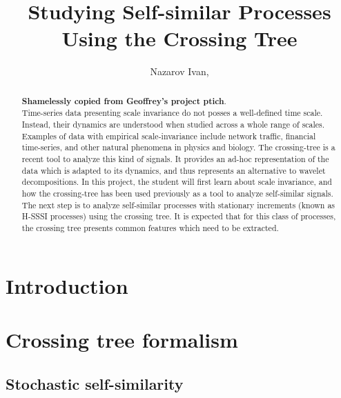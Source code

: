 \documentclass[a4paper]{report}
\title{Studying Self-similar Processes Using the Crossing Tree}
\author{Nazarov Ivan, \rus{101мНОД(ИССА)}}
\begin{document}

\clearpage


\clearpage

\maketitle
\begin{abstract}
\textbf{Shamelessly copied from Geoffrey's project ptich}.\hfill \\
Time-series data presenting scale invariance do not posses a well-defined time scale.
Instead, their dynamics are understood when studied across a whole range of scales.
Examples of data with empirical scale-invariance include network traffic, financial
time-series, and other natural phenomena in physics and biology. The crossing-tree
is a recent tool to analyze this kind of signals. It provides an ad-hoc representation
of the data which is adapted to its dynamics, and thus represents an alternative to
wavelet decompositions. In this project, the student will first learn about scale
invariance, and how the crossing-tree has been used previously as a tool to analyze
self-similar signals. The next step is to analyze self-similar processes with stationary
increments (known as H-SSSI processes) using the crossing tree. It is expected that
for this class of processes, the crossing tree presents common features which need
to be extracted.
\end{abstract}

\tableofcontents
\clearpage
{}


\chapter*{Introduction} %
\label{cha:introduction}


\chapter{Crossing tree formalism} %
\label{cha:crossing_tree_formalism}

\section{Stochastic self-similarity} %
\label{sec:stochastic_self_similarity}
\end{document}
